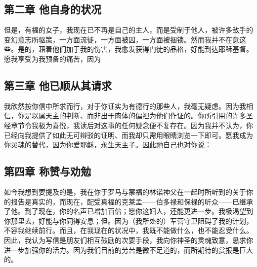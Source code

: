 
\subsection{第二章 他自身的状况}

但是，有福的女子，我现在已不再是自己的主人，而是受制于他人，被许多敌手的变幻意志所驱策，一方面流徙，一方面被囚，一方面被捆锁。然而我并不在意这些。是的，藉着他们加于我的伤害，我愈发获得门徒的品格，好能到达耶稣基督。愿我享受为我预备的痛苦，因为\par


\subsection{第三章 他已顺从其请求}

我欣然按你信中所求而行，对于你证实为有德行的那些人，我毫无疑虑。因为我相信，你是以属天主的判断、而非出于肉体的偏袒为他们作证的。你所引用的许多圣经章节令我极为喜悦，我读后对这事的任何疑念便不复存在。因为我并不认为，你已经向我提供了如此无可辩驳的证明、而我却只需用眼睛浏览一下即可。愿我成为你灵魂的替代，因为你爱耶稣，永生天主子。因此祂自己也对你说：\par


\subsection{第四章 称赞与劝勉}

如今我想到要提及的是，我在你于罗马与蒙福的林诺神父在一起时所听到的关于你的报告是真实的，而现在，配受真福的克莱孟——伯多禄和保禄的听众——已继承了他。到了现在，你的名声已增加百倍；愿你这妇人，还能更进一步。我极渴望到你那里去，好能与你同得安息；但。因为（我所处的）军营守卫阻碍了我的计划，不容我继续前行。而且，在我现在的状况中，我既不能做什么，也不能忍受什么。因此，我认为写信是朋友们相互鼓励的次要手段，我向你神圣的灵魂致意，恳求你进一步加强你的活力。因为我们目前的劳苦是微不足道的，而所期待的赏报是巨大的。\par

